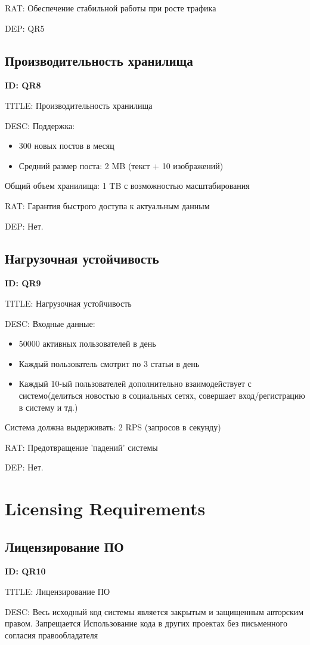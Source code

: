 \documentclass{scrreprt}
\begin{document}
RAT: Обеспечение стабильной работы при росте трафика

DEP: QR5

\subsection{Производительность хранилища}
\textbf{ID: QR8}

TITLE: Производительность хранилища

DESC:
Поддержка:
\begin{itemize}
\item 300 новых постов в месяц
\item Средний размер поста: 2 MB (текст + 10 изображений)
\end{itemize}
Общий объем хранилища: 1 TB с возможностью масштабирования

RAT: Гарантия быстрого доступа к актуальным данным

DEP: Нет.

\subsection{Нагрузочная устойчивость}
\textbf{ID: QR9}

TITLE: Нагрузочная устойчивость

DESC:
Входные данные:
\begin{itemize}
\item 50000 активных пользователей в день
\item Каждый пользователь смотрит по 3 статьи в день
\item Каждый 10-ый пользователей дополнительно взаимодействует с системо(делиться новостью в социальных сетях, совершает вход/регистрацию в систему и тд.)
\end{itemize}
Система должна выдерживать:
2 RPS (запросов в секунду)

RAT: Предотвращение 'падений' системы

DEP: Нет.
\section{Licensing Requirements}
\subsection{Лицензирование ПО}
\textbf{ID: QR10 }

TITLE: Лицензирование ПО

DESC:
Весь исходный код системы является закрытым и защищенным авторским правом. Запрещается
Использование кода в других проектах без письменного согласия правообладателя
\end{document}
